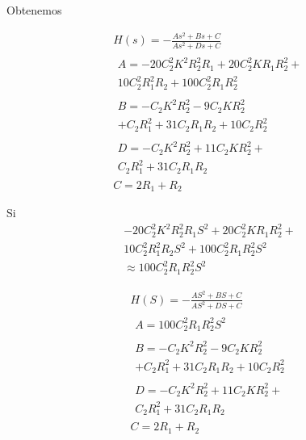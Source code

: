 \documentclass[../../tc_tp3_main.tex]{subfiles}
\begin{document}
Obtenemos


\begin{gather}
H(s)=-\frac{As^2+Bs+C}{As^2+Ds+C}\\
\begin{split}
A=-20C_{2}^2 K^2 R_{2}^2 R_{1}   +    20 C_{2}^{2} K R_{1} R_{2}^2 + \\ 10 C_{2}^2 R_{1}^2 R_{2} +  100 C_{2}^{2} R_{1} R_{2}^2  
\end{split}\\
\begin{split}
B= -C_2K^2 R_2^2 -9 C_2 K R_2^2  \\+ C_2 R_1^2  + 31 C_2 R_1 R_2  + 10 C_2 R_2^2  
\end{split}\\
\begin{split}
D=-C_2 K^2 R_2^2+11C_2K R_2^2 +\\ C_2 R_1^2+31 C_2 R_1 R_2
\end{split}\\
C=2R_1+R_2
\end{gather}





Si
\begin{equation}
\begin{split}
-20C_{2}^2 K^2 R_{2}^2 R_{1}  S^{2} +    20 C_{2}^{2} K R_{1} R_{2}^2+\\ 10 C_{2}^2 R_{1}^2 R_{2} S^{2} + 100 C_{2}^{2} R_{1} R_{2}^2 S^{2}  \\   \approx 100 C_{2}^2 R_{1} R_{2} ^2 S^2
\end{split}
\end{equation}

\begin{gather}
H(S)=-\frac{AS^2+BS+C}{AS^2+DS+C} \label{eq:MfinalR}\\
\begin{split}
A=100 C_{2}^2 R_{1} R_{2} ^2 S^2
\end{split}\\
\begin{split}
B= -C_2K^2 R_2^2 -9 C_2 K R_2^2  \\+ C_2 R_1^2  + 31 C_2 R_1 R_2  + 10 C_2 R_2^2  
\end{split}\\
\begin{split}
D=-C_2 K^2 R_2^2+11C_2K R_2^2 + \\ C_2 R_1^2+31 C_2 R_1 R_2
\end{split}\\
C=2R_1+R_2
\end{gather}
\end{document}
